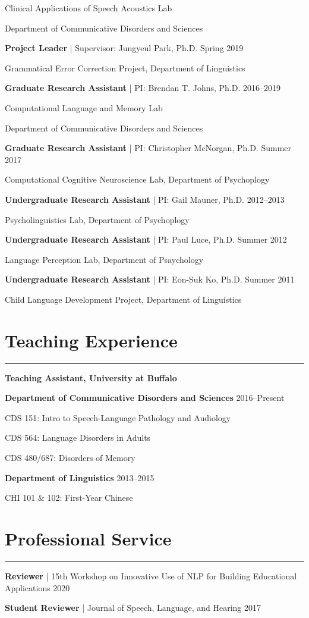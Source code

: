 \documentclass[11pt]{article}
\newcommand{\resumesection}[1]{\vspace{-0.2cm}\section*{#1}\vspace{-0.2cm}\hrule\vspace{0.2cm}}
\begin{document}
\quad Clinical Applications of Speech Acoustics Lab

\quad Department of Communicative Disorders and Sciences

\textbf{Project Leader} | Supervisor: Jungyeul Park, Ph.D. \hfill Spring 2019

\quad Grammatical Error Correction Project, Department of Linguistics

\textbf{Graduate Research Assistant} | PI: Brendan T. Johns, Ph.D. \hfill 2016--2019

\quad Computational Language and Memory Lab

\quad Department of Communicative Disorders and Sciences

\textbf{Graduate Research Assistant} | PI: Christopher McNorgan, Ph.D. \hfill Summer 2017

\quad Computational Cognitive Neuroscience Lab, Department of Psychoplogy

\textbf{Undergraduate Research Assistant} | PI: Gail Mauner, Ph.D. \hfill 2012--2013

\quad Psycholinguistics Lab, Department of Psychoplogy

\textbf{Undergraduate Research Assistant} | PI: Paul Luce, Ph.D. \hfill Summer 2012

\quad Language Perception Lab, Department of Psaychology

\textbf{Undergraduate Research Assistant} | PI: Eon-Suk Ko, Ph.D. \hfill Summer 2011

\quad Child Language Development Project, Department of Linguistics

\resumesection{Teaching Experience}
\textbf{Teaching Assistant, University at Buffalo}

\textbf{Department of Communicative Disorders and Sciences} \hfill 2016--Present

\quad CDS 151: Intro to Speech-Language Pathology and Audiology

\quad CDS 564: Language Disorders in Adults

\quad CDS 480/687: Disorders of Memory

\textbf{Department of Linguistics} \hfill 2013--2015

\quad CHI 101 \& 102: First-Year Chinese

\resumesection{Professional Service}

\textbf{Reviewer} | 15th Workshop on Innovative Use of NLP for Building Educational Applications \hfill 2020

\textbf{Student Reviewer} | Journal of Speech, Language, and Hearing \hfill 2017
\end{document}
